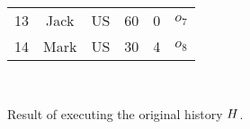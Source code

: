 \begin{figure}[t]
\begin{minipage}{1\linewidth}
{\begin{minipage}{1.5\columnwidth}
\begin{tabular}{|c|c|c|c|c|l}
                                                                                                                                                                                  13                                                         & Jack             & US              & 60            & 0                   & $o_7$                                                          \\
                                                                                                                                                                                                                                          14 & Mark             & US              & 30            & 4                   & $o_8$                                                           \\ \cline{1-5}
        \end{tabular}
      \end{minipage}
    }                                                                                                                                                     \\[-3mm]
    \caption{Result of  executing the original history $H$.}
    \label{fig:updated-example-instance}
  \end{minipage}
\end{figure}
